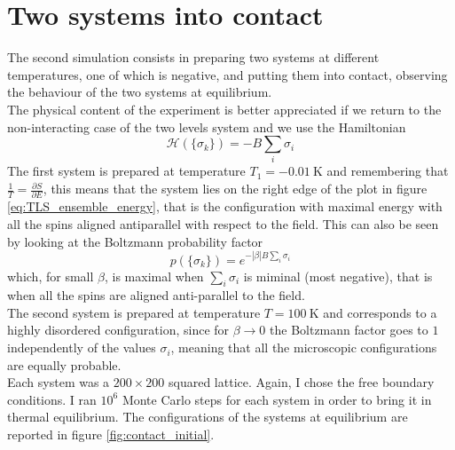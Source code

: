\section{Two systems into contact}
The second simulation consists in preparing two systems at different temperatures, one of which is negative, and putting them into contact, observing the behaviour of the two systems at equilibrium. \\
The physical content of the experiment is better appreciated if we return to the non-interacting case of the two levels system and we use the Hamiltonian
\begin{equation*}
    \mathcal{H}(\{\sigma_k\}) = -B \sum_i \sigma_i
\end{equation*}
The first system is prepared at temperature $T_1 = \SI{-0.01}{\kelvin}$ and remembering that $\frac{1}{T} = \frac{\partial S}{\partial E}$, this means that the system lies on the right edge of the plot in figure \ref{eq:TLS_ensemble_energy}, that is the configuration with maximal energy with all the spins aligned antiparallel with respect to the field. This can 
also be seen by looking at the Boltzmann probability factor 
\begin{equation*}
    p(\{\sigma_k\}) = e^{-|\beta| B \sum_i \sigma_i}
\end{equation*}
which, for small $\beta$, is maximal when $\sum_i \sigma_i$ is miminal (most negative), that is when all the spins are aligned anti-parallel to the field. \\
The second system is prepared at temperature $T=\SI{100}{\kelvin}$ and corresponds to a highly disordered configuration, since for $\beta \to 0$ the Boltzmann factor goes to $1$ independently of the values $\sigma_i$, meaning that all the microscopic configurations are equally probable. \\
Each system was a $200 \times 200$ squared lattice. Again, I chose the free boundary conditions. I ran $10^6$ Monte Carlo steps for each system in order to bring it in thermal equilibrium. The configurations of the systems at equilibrium are reported in figure \ref{fig:contact_initial}. \par
